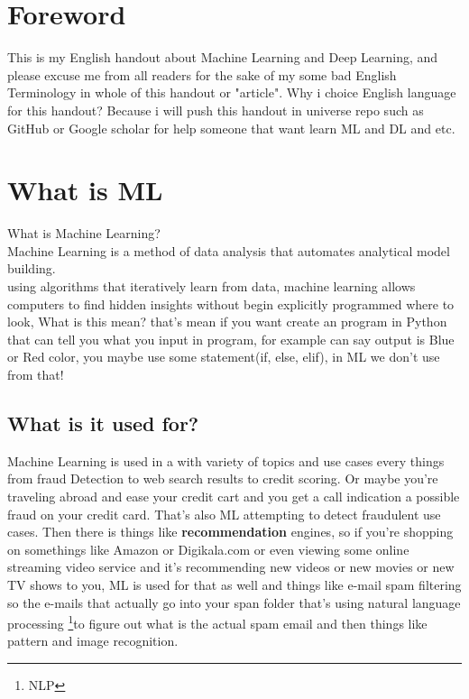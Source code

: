 \documentclass[12pt]{article}
\begin{document}
\tableofcontents
\newpage

\section{Foreword}
This is my English handout about Machine Learning and Deep Learning, and please excuse me from all readers for the sake of my some bad English Terminology in whole of this handout or "article". Why i choice English language for this handout? Because i will push this handout in universe repo such as GitHub or Google scholar for help someone that want learn ML and DL and etc.

\newpage

\section{What is ML}

\LARGE What is Machine Learning?\\
\small Machine Learning is a method of data analysis that automates analytical model building.\\
using algorithms that iteratively learn from data, machine learning allows computers to find hidden insights without begin explicitly programmed where to look, What is this mean? that's mean if you want create an program in Python that can tell you what you input in program, for example can say output is Blue or Red color, you maybe use some statement(if, else, elif), in ML we don't use from that!

\subsection{What is it used for?}
Machine Learning is used in a with variety of topics and use cases every things from fraud Detection to web search results to credit scoring. Or maybe you're traveling abroad and ease your credit cart and you get a call indication a possible fraud on your credit card. That's also ML attempting to detect fraudulent use cases. Then there is things like \textbf{recommendation} engines, so if you're shopping on somethings like Amazon or Digikala.com or even viewing some online streaming video service and it's recommending new videos or new movies or new TV shows to you, ML is used for that as well and things like e-mail spam filtering so the e-mails that actually go into your span folder that's using natural language processing
\footnote{NLP}to figure out what is the actual spam email and then things like pattern and image recognition. \\
\end{document}
